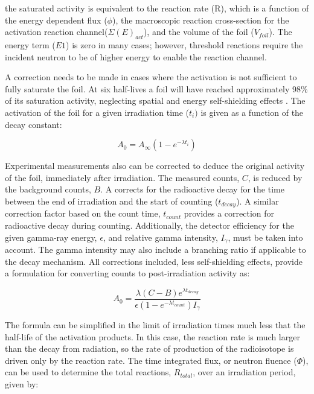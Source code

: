 \documentclass[journal]{IEEEtran}
\begin{document}
\noindent the saturated activity is equivalent to the reaction rate (R), which is a function of the energy dependent flux ($\phi$), the macroscopic reaction cross-section for the activation reaction channel($\Sigma(E)_{act}$), and the volume of the foil ($V_{foil}$). 
The energy term ($E1$) is zero in many cases; however, threshold reactions require the incident neutron to be of higher energy to enable the reaction channel. 
	
	A correction needs to be made in cases where the activation is not sufficient 
	to fully saturate the foil. At six half-lives a foil will have reached 
	approximately 98\% of its saturation activity, neglecting spatial and energy 
	self-shielding effects \cite{Knoll}. The activation of the foil for a given 
	irradiation time ($t_{i})$ is given as a function of the decay 
	constant: 

	\begin{equation} \label{eq:ReactionRate}
	A_{0} = A_{\infty}(1-e^{-\lambda t_{i}}) 
	\end{equation}
	
	Experimental measurements also can be corrected to deduce the original activity 
	of the foil, immediately after irradiation. The measured counts, $C$, is reduced 
	by the background counts, $B$. A corrects for the 
	radioactive decay for the time between the end of 
	irradiation and the start of counting ($t_{decay}$). A similar correction factor based on 
	the count time, $t_{count}$ provides a correction for radioactive decay during counting. 
	Additionally, the detector efficiency for the given gamma-ray energy, $\epsilon$,  
	and relative gamma intensity, $I_{\gamma}$, must be taken into account. The 
	gamma intensity may also include a branching ratio if applicable to the decay 
	mechanism. All corrections included, less self-shielding effects, provide a 
	formulation for converting counts to post-irradiation activity as: 
	
	\begin{equation} \label{eq:MeasActivity}
	A_{0} = \frac{\lambda (C-B) e^{\lambda t_{decay}}}{\epsilon (1-e^{-\lambda 
			t_{count}})I_{\gamma}}
	\end{equation}
	
	The formula can be simplified in the limit of irradiation times much less that 
	the half-life of the activation products. In this case, the reaction rate is 
	much larger than the decay from radiation, so the rate of production of the 
	radioisotope is driven only by the reaction rate. The time integrated flux, 
	or neutron fluence ($\Phi$), can be used to determine the total reactions, $R_{total}$,
	over an irradiation period, given by:
	
\end{document}

